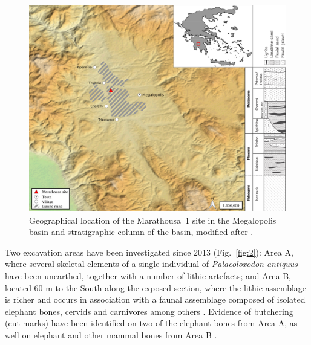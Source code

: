 \documentclass[preprint,authoryear,times]{elsarticle} %
\begin{document}
\begin{figure}[]
  \centering
  \includegraphics[width=1\textwidth]{./artwork/Fig1.png}
  \caption{Geographical location of the Marathousa~1 site in the Megalopolis basin and stratigraphic column of the basin, modified after \cite{Vugt2000}.}
  \label{fig:1}
\end{figure}

Two excavation areas have been investigated since 2013 (Fig.~\ref{fig:2}): Area A, where several skeletal elements of a single individual of \emph{Palaeoloxodon antiquus} have been unearthed, together with a number of lithic artefacts; and Area B, located 60 m to the South along the exposed section, where the lithic assemblage is richer and occurs in association with a faunal assemblage composed of isolated elephant bones, cervids and carnivores among others \citep{Konidaris,Tourloukis}. Evidence of butchering (cut-marks) have been identified on two of the elephant bones from Area A, as well on elephant and other mammal bones from Area B \citep{Konidaris}.
\end{document}
